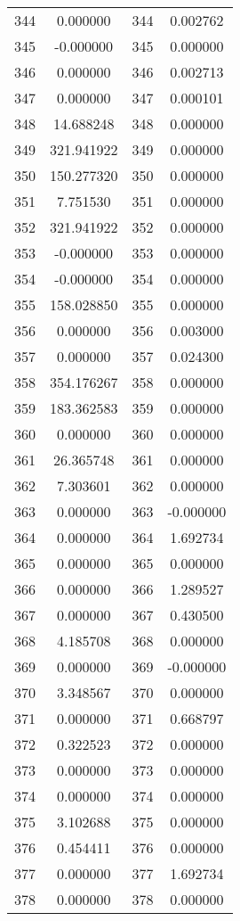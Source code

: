 \documentclass[12pt]{article}
\begin{document}
\begin{longtable}{@{}cccc@{}}
344 & 0.000000 & 344 & 0.002762 \\
345 & -0.000000 & 345 & 0.000000 \\
346 & 0.000000 & 346 & 0.002713 \\
347 & 0.000000 & 347 & 0.000101 \\
348 & 14.688248 & 348 & 0.000000 \\
349 & 321.941922 & 349 & 0.000000 \\
350 & 150.277320 & 350 & 0.000000 \\
351 & 7.751530 & 351 & 0.000000 \\
352 & 321.941922 & 352 & 0.000000 \\
353 & -0.000000 & 353 & 0.000000 \\
354 & -0.000000 & 354 & 0.000000 \\
355 & 158.028850 & 355 & 0.000000 \\
356 & 0.000000 & 356 & 0.003000 \\
357 & 0.000000 & 357 & 0.024300 \\
358 & 354.176267 & 358 & 0.000000 \\
359 & 183.362583 & 359 & 0.000000 \\
360 & 0.000000 & 360 & 0.000000 \\
361 & 26.365748 & 361 & 0.000000 \\
362 & 7.303601 & 362 & 0.000000 \\
363 & 0.000000 & 363 & -0.000000 \\
364 & 0.000000 & 364 & 1.692734 \\
365 & 0.000000 & 365 & 0.000000 \\
366 & 0.000000 & 366 & 1.289527 \\
367 & 0.000000 & 367 & 0.430500 \\
368 & 4.185708 & 368 & 0.000000 \\
369 & 0.000000 & 369 & -0.000000 \\
370 & 3.348567 & 370 & 0.000000 \\
371 & 0.000000 & 371 & 0.668797 \\
372 & 0.322523 & 372 & 0.000000 \\
373 & 0.000000 & 373 & 0.000000 \\
374 & 0.000000 & 374 & 0.000000 \\
375 & 3.102688 & 375 & 0.000000 \\
376 & 0.454411 & 376 & 0.000000 \\
377 & 0.000000 & 377 & 1.692734 \\
378 & 0.000000 & 378 & 0.000000 \\

\end{longtable}
\end{document}
